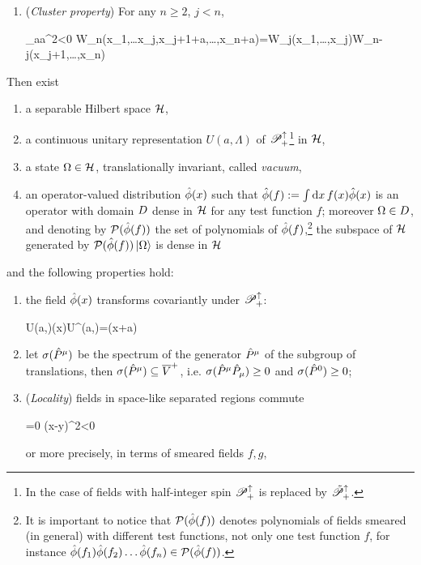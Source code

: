 \documentclass[../main/main.tex]{subfiles}
\begin{document}
\begin{theorem}
\begin{enumerate}[label=(\arabic*)]
		\item (\emph{Cluster property}) For any $n\geq2$, $j<n$,
		\begin{eq}
			\lim_{a\to\infty\atop a^2<0} W_n(x_1,\ldots x_j,x_{j+1}+a,\ldots,x_n+a)=W_j(x_1,\ldots,x_j)W_{n-j}(x_{j+1},\ldots,x_n)
		\end{eq}
	\end{enumerate}
	Then exist
	\begin{enumerate}[label=(\arabic*')]
		\item a separable Hilbert space $\mathcal H$,
		\item a continuous unitary representation $U(a,\Lambda)$ of $\mathscr P_+^\uparrow$\footnote{In the case of fields with half-integer spin $\mathscr P_+^\uparrow$ is replaced by $\tilde {\mathscr P}_+^\uparrow$.} in $\mathcal H$,
		\item a state $\Omega\in\mathcal H$, translationally invariant, called \emph{vacuum},
		\item an operator-valued distribution $\hat{\phi}(x)$ such that $\hat{\phi}(f):=\int\textnormal{d} x\,f(x)\hat{\phi}(x)$ is an operator with domain $D$ dense in $\mathcal H$ for any test function $f$; moreover $\Omega\in D$, and denoting by $\mathcal P(\hat{\phi}(f))$ the set of polynomials of $\hat{\phi}(f)$,\footnote{It is important to notice that $\mathcal P(\hat{\phi}(f))$ denotes polynomials of fields smeared (in general) with different test functions, not only one test function $f$, for instance $\hat{\phi}(f_1)\hat{\phi}(f_2)\ldots\hat{\phi}(f_n)\in\mathcal P(\hat{\phi}(f))$.} the subspace of $\mathcal H$ generated by $\mathcal P(\hat{\phi}(f))\,\vert\Omega\rangle$ is dense in $\mathcal H$
	\end{enumerate}
	and the following properties hold:
	\begin{enumerate}[label=(\arabic*'), resume]
		\item the field $\hat{\phi}(x)$ transforms covariantly under $\mathscr P_+^\uparrow$:
		\begin{eq}
			U(a,\Lambda)\ophi(x)U^\dagger(a,\Lambda)=\ophi(\Lambda x+a)
		\end{eq}
		\item let $\sigma(\hat{P}^\mu)$ be the spectrum of the generator $\hat{P}^\mu$ of the subgroup of translations, then $\sigma(\hat{P}^\mu)\subseteq\overline V^+$, i.e. $\sigma(\hat{P}^\mu\hat{P}_\mu)\geq 0$ and $\sigma(\hat{P}^0)\geq 0$;
		\item (\emph{Locality}) fields in space-like separated regions commute
		\begin{eq}
			=0 \tif (x-y)^2<0
		\end{eq}
		or more precisely, in terms of smeared fields $f,g$,
		\begin{eq}

\end{eq}
\end{enumerate}
\end{theorem}
\end{document}
